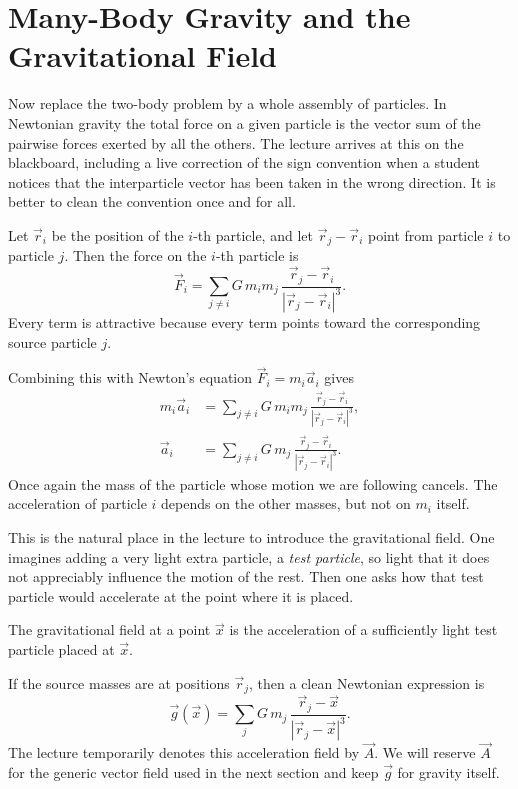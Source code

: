 \section{Many-Body Gravity and the Gravitational Field}

Now replace the two-body problem by a whole assembly of particles. In Newtonian gravity the total force on a given particle is the vector sum of the pairwise forces exerted by all the others. The lecture arrives at this on the blackboard, including a live correction of the sign convention when a student notices that the interparticle vector has been taken in the wrong direction. It is better to clean the convention once and for all.

Let \(\vec r_i\) be the position of the \(i\)-th particle, and let \(\vec r_j-\vec r_i\) point from particle \(i\) to particle \(j\). Then the force on the \(i\)-th particle is
\begin{equation}
\vec F_i=\sum_{j\ne i} G\,m_i m_j\,
\frac{\vec r_j-\vec r_i}{|\vec r_j-\vec r_i|^3}.
\end{equation}
Every term is attractive because every term points toward the corresponding source particle \(j\).

Combining this with Newton's equation \(\vec F_i=m_i\vec a_i\) gives
\begin{align}
m_i\vec a_i
&=\sum_{j\ne i} G\,m_i m_j\,
\frac{\vec r_j-\vec r_i}{|\vec r_j-\vec r_i|^3}, \\
\vec a_i
&=\sum_{j\ne i} G\,m_j\,
\frac{\vec r_j-\vec r_i}{|\vec r_j-\vec r_i|^3}.
\end{align}
Once again the mass of the particle whose motion we are following cancels. The acceleration of particle \(i\) depends on the other masses, but not on \(m_i\) itself.

This is the natural place in the lecture to introduce the gravitational field. One imagines adding a very light extra particle, a \emph{test particle}, so light that it does not appreciably influence the motion of the rest. Then one asks how that test particle would accelerate at the point where it is placed.

\begin{definition}
The gravitational field at a point \(\vec x\) is the acceleration of a sufficiently light test particle placed at \(\vec x\).
\end{definition}

If the source masses are at positions \(\vec r_j\), then a clean Newtonian expression is
\begin{equation}
\vec g(\vec x)=\sum_j G\,m_j\,
\frac{\vec r_j-\vec x}{|\vec r_j-\vec x|^3}.
\end{equation}
The lecture temporarily denotes this acceleration field by \(\vec A\). We will reserve \(\vec A\) for the generic vector field used in the next section and keep \(\vec g\) for gravity itself.

